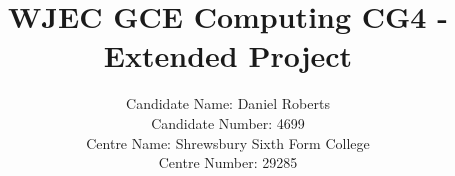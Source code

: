 \title{WJEC GCE Computing CG4 - Extended Project}

\author{Candidate Name: Daniel Roberts\\
		Candidate Number: 4699\\
		Centre Name: Shrewsbury Sixth Form College\\
		Centre Number: 29285}

\date{}